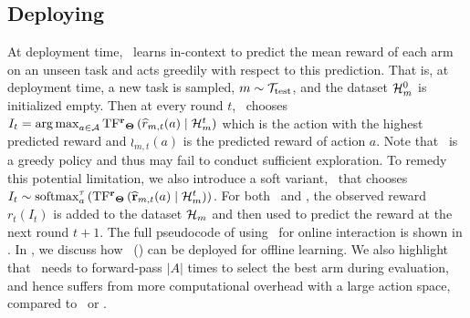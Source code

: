 \subsection{Deploying \pred\ }%
\vspace*{-0.5em}
At deployment time, \pred\ learns in-context to predict the mean reward of each arm on an unseen task and acts greedily with respect to this prediction.
%
% 
%
That is, at deployment time, a new task is sampled, $m \sim \mathcal{T}_{\text{test}}$, and the dataset $\mathcal{H}_m^0$ is initialized empty. Then at every round $t$,  
\pred\ chooses $I_t = \mathop{\rm arg\,max}_{a\in\mathcal{A}} \mathrm{TF^{\mathbf{r}}}_{\mathbf{\Theta}}\left( \widehat{r}_{m,t}(a) \mid \mathcal{H}^t_m\right)$ which is the action with the highest predicted reward and $\wr_{m,t}(a)$ is the predicted reward of action $a$. 
%
Note that \pred\ is a greedy policy and thus may fail to conduct sufficient exploration. To remedy this potential limitation, we also introduce a soft variant, \predt\, that chooses $I_t \sim \mathrm{softmax}^\tau_a\left(\mathrm{TF^{\mathbf{r}}}_{\mathbf{\Theta}}\left( \mathbf{\widehat{r}}_{m,t}(a) \mid \mathcal{H}^t_m\right)\right)$.
For both \pred\ and \predt, the observed reward $r_t(I_t)$ is added to the dataset $\mathcal{H}_m$ and then used to predict the reward at the next round $t+1$. The full pseudocode of using \pred\ for online interaction is shown in .
%
In , we discuss how \pred\ (\gt) can be deployed for offline learning. We also highlight that \pred\ needs to forward-pass $|A|$ times to select the best arm during evaluation, and hence suffers from more computational overhead with a large action space, compared to \ad\ or \dpt.
%
%
